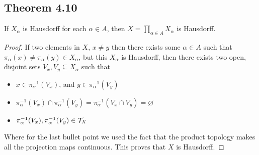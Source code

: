 \documentclass[../../main.tex]{subfiles}
\begin{document}
\subsection{Theorem 4.10}
\begin{wts}
    If $X_\alpha$ is Hausdorff for each $\alpha\in A$, then $X=\prod_{\alpha\in A}X_\alpha$ is Hausdorff.
\end{wts}
\newcommand{\pimap}[2]{\pi_{#1}({#2})}
\newcommand{\pinverse}[2]{\pi_{#1}^{-1}({#2})}
\begin{proof}
If two elements in $X$, $x\neq y$ then there exists some $\alpha\in A$ such that $\pimap{\alpha}{x}\neq\pimap{\alpha}{y}\in X_\alpha$, but this $X_\alpha$ is Hausdorff, then there exists two open, disjoint sets $V_x, V_y\subseteq X_\alpha$ such that
\begin{itemize}
    \item $x\in \pinverse{\alpha}{V_x}$, and $y\in \pinverse{\alpha}{V_y}$
    \item $\pinverse{\alpha}{V_x}\cap\pinverse{\alpha}{V_y} = \pinverse{\alpha}{V_x\cap V_y}=\varnothing$
    \item $\pinverse{\alpha}{V_x},\pinverse{\alpha}{V_y}\in \Tau_X$
\end{itemize}
Where for the last bullet point we used the fact that the product topology makes all the projection maps continuous. This proves that $X$ is Hausdorff.
\end{proof}
\end{document}

